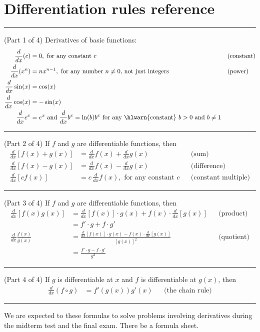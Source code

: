 \documentclass[../main.tex]{subfiles}
\begin{document}
 \section{Differentiation rules reference}

\hrule
(Part 1 of 4) Derivatives of basic functions:
\begin{align*}
  \frac{d}{dx} (c)
  &= 0, \text{ for any constant \(c\)}
  && \text{(constant)} \\
  \frac{d}{dx} (x^{n})
  &= n x^{n-1}, \text{ for any number \(n \ne 0\), not just integers}
  && \text{(power)} \\
  \frac{d}{dx} \sin(x)
  &= \cos(x) \\
  \frac{d}{dx} \cos(x)
  &= -\sin(x) \\
  \frac{d}{dx} e^{x} &= e^{x} \text{ and } \frac{d}{dx}b^{x} = \ln(b)b^{x} \text{ for any \hlwarn{constant} } b > 0 \text{ and } b \ne 1
\end{align*}

\hrule

(Part 2 of 4) If \(f\) and \(g\) are differentiable functions, then
\begin{align*}
  \frac{d}{dx} [f(x) + g(x)]
  &= \frac{d}{dx}f(x) + \frac{d}{dx}g(x)
  && \text{(sum)} \\[1em]
  \frac{d}{dx} [f(x) - g(x)]
  &= \frac{d}{dx}f(x) - \frac{d}{dx}g(x)
  && \text{(difference)} \\[1em]
  \frac{d}{dx} [c f(x)]
  &= c \, \frac{d}{dx} f(x), \text{ for any constant \(c\)}
  && \text{(constant multiple)}
\end{align*}

\hrule

(Part 3 of 4) If \(f\) and \(g\) are differentiable functions, then
\begin{align*}
  \frac{d}{dx} [f(x)g(x)]
  &= { \frac{d}{dx} [f(x)] \cdot g(x)+ f(x) \cdot \frac{d}{dx}[g(x)]}
  && \text{(product)} \\
  &= f' \cdot g + f \cdot g' \\[1em]
  \frac{d}{dx} \frac{f(x)}{g(x)}
  &= {\frac{\frac{d}{dx} [f(x)] \cdot g(x) - f(x) \cdot \frac{d}{dx}[g(x)] }{ [g(x)]^{2} }}
  && \text{(quotient)} \\
  &= \frac{f' \cdot g - f \cdot g'}{g^{2}}
\end{align*}

\hrule

(Part 4 of 4) If \(g\) is differentiable at \(x\) and \(f\) is differentiable at \(g(x)\), then
\begin{align*}
  \frac{d}{dx} (f \circ g)
  &= f'(g(x)) g'(x)
  &&\text{(the chain rule)}
\end{align*}

\hrule

\faExclamationTriangle{} We are expected to  these formulas to solve problems involving derivatives during the midterm test and the final exam. There  be a formula sheet.
\end{document}
